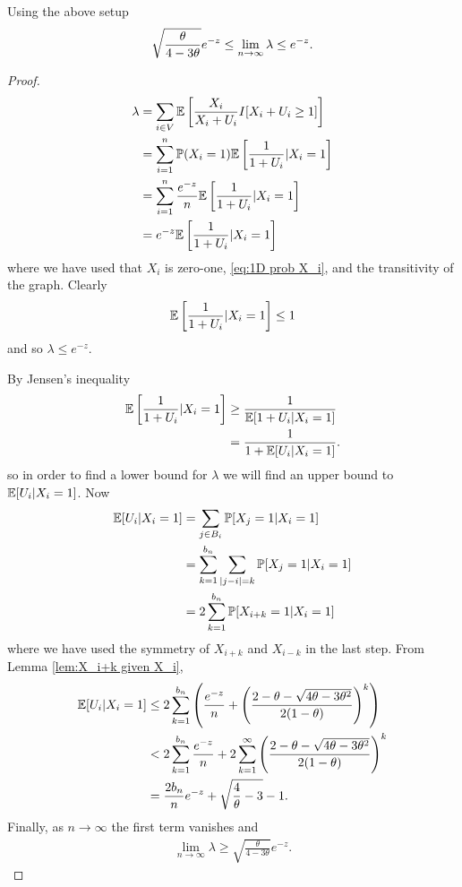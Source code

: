 	\begin{lemma}
	\label{lem:1Dlambda}
		Using the above setup
		\begin{equation}
			\sqrt{\frac{\theta}{4 - 3\theta}}e^{-z} \leq \lim_{n \rightarrow \infty} \lambda \leq e^{-z}.
		\end{equation}
	\end{lemma}
	\begin{proof}
		\begin{align}
			\lambda &= \sum_{i \in V} \mathbb{E}\left[\frac{X_i}{X_i + U_i} I[ X_i + U_i \geq 1] \right]\\
				&= \sum_{i = 1}^n \mathbb{P}(X_i = 1) \mathbb{E} \left[\frac{1}{1 + U_i}| X_i = 1\right]\\
				&= \sum_{i = 1}^n \frac{e^{-z}}{n} \mathbb{E} \left[\frac{1}{1 + U_i}| X_i = 1\right]\\
				&= e^{-z} \mathbb{E} \left[\frac{1}{1 + U_i}| X_i = 1\right]
		\end{align}
		where we have used that $X_i$ is zero-one, \eqref{eq:1D prob X_i}, and the transitivity of the graph.
		Clearly 
		\begin{align}
			\mathbb{E} \left[\frac{1}{1 + U_i}| X_i = 1\right] \leq 1
		\end{align}
		and so $\lambda \leq e^{-z}$.

		By Jensen's inequality
		\begin{align}
			\mathbb{E} \left[\frac{1}{1 + U_i}| X_i = 1\right] &\geq \frac{1}{\mathbb{E}[1 + U_i | X_i = 1]}\\
				&= \frac{1}{1 + \mathbb{E}[U_i | X_i = 1]}.
		\end{align}
		so in order to find a lower bound for $\lambda$ we will find an upper bound to $\mathbb{E}[U_i | X_i = 1]$. Now
		\begin{align}
			\mathbb{E}[U_i | X_i = 1] &= \sum_{j \in B_i} \mathbb{P}[X_j = 1| X_i = 1]\\
				&= \sum_{k=1}^{b_n} \sum_{|j - i| = k} \mathbb{P}[X_j = 1| X_i = 1]\\
				&= 2 \sum_{k=1}^{b_n} \mathbb{P}[X_{i+k} = 1 | X_i = 1]
		\end{align}
		where we have used the symmetry of $X_{i+k}$ and $X_{i -k}$ in the last step. From Lemma \ref{lem:X_i+k given X_i}, 
		\begin{align}
			\mathbb{E}[U_i | X_i = 1] &\leq 2 \sum_{k = 1}^{b_n} \left(\frac{e^{-z}}{n} + \left(\frac{2 - \theta - \sqrt{4\theta - 3\theta^2}}{2(1 - \theta)}\right)^k\right)\\
				&< 2 \sum_{k = 1}^{b_n} \frac{e^{-z}}{n} + 2\sum_{k = 1}^\infty \left(\frac{2 - \theta - \sqrt{4\theta - 3\theta^2}}{2(1 - \theta)}\right)^k\\
				&= \frac{2 b_n}{n}e^{-z} + \sqrt{\frac{4}{\theta} - 3} - 1.
		\end{align}
		Finally, as $n \rightarrow \infty$ the first term vanishes and
		\begin{align}
			\lim_{n \rightarrow \infty} \lambda \geq \sqrt{\frac{\theta}{4 - 3\theta}} e^{-z}.
		\end{align}
	\end{proof}

